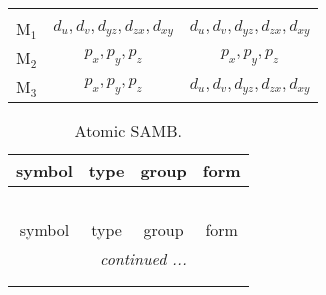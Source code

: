 \documentclass[fleqn,10pt,landscape]{article}
\begin{document}
\begin{itemize}
\begin{center}
\begin{longtable}{c|c|c}
 \hline \hline
\multicolumn{2}{r}{} \\ \endlastfoot

M$_{1}$ & $d_{u}, d_{v}, d_{yz}, d_{zx}, d_{xy}$ & $d_{u}, d_{v}, d_{yz}, d_{zx}, d_{xy}$ \\
M$_{2}$ & $p_{x}, p_{y}, p_{z}$ & $p_{x}, p_{y}, p_{z}$ \\
M$_{3}$ & $p_{x}, p_{y}, p_{z}$ & $d_{u}, d_{v}, d_{yz}, d_{zx}, d_{xy}$ \\
\end{longtable}
\end{center}
\begin{center}
\renewcommand{\arraystretch}{1.3}
\begin{longtable}{c|c|c|c}
\caption{Atomic SAMB.}
 \\
 \hline \hline
symbol & type & group & form \\ \hline \endfirsthead

\multicolumn{3}{l}{\tablename\ \thetable{}} \\
 \hline \hline
symbol & type & group & form \\ \hline \endhead

 \hline \hline
\multicolumn{3}{r}{\footnotesize\it continued ...} \\ \endfoot

 \hline \hline
\multicolumn{3}{r}{} \\ \endlastfoot


\end{longtable}
\end{center}
\end{itemize}
\end{document}
